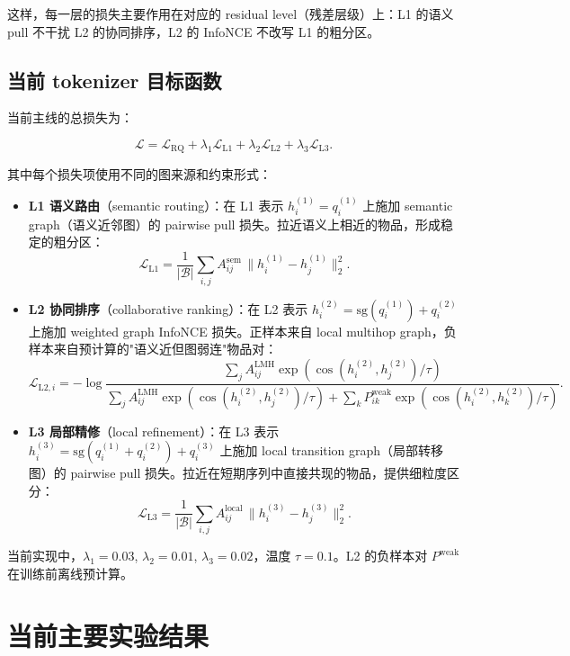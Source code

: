\documentclass[11pt]{article}
\newcommand{\sg}{\mathrm{sg}}
\begin{document}
这样，每一层的损失主要作用在对应的 residual level（残差层级）上：L1 的语义 pull 不干扰 L2 的协同排序，L2 的 InfoNCE 不改写 L1 的粗分区。

\subsection{当前 tokenizer 目标函数}

当前主线的总损失为：

\[
\mathcal{L}
=
\mathcal{L}_{\mathrm{RQ}}
+\lambda_1\mathcal{L}_{\mathrm{L1}}
+\lambda_2\mathcal{L}_{\mathrm{L2}}
+\lambda_3\mathcal{L}_{\mathrm{L3}}.
\]

其中每个损失项使用不同的图来源和约束形式：

\begin{itemize}
  \item \textbf{L1 语义路由}（semantic routing）：在 L1 表示 $h_i^{(1)}=q_i^{(1)}$ 上施加 semantic graph（语义近邻图）的 pairwise pull 损失。拉近语义上相近的物品，形成稳定的粗分区：
  \[
  \mathcal{L}_{\mathrm{L1}}
  =\frac{1}{|\mathcal{B}|}\sum_{i,j} A^{\mathrm{sem}}_{ij}\,
  \lVert h_i^{(1)}-h_j^{(1)}\rVert_2^2.
  \]

  \item \textbf{L2 协同排序}（collaborative ranking）：在 L2 表示 $h_i^{(2)}=\sg(q_i^{(1)})+q_i^{(2)}$ 上施加 weighted graph InfoNCE 损失。正样本来自 local multihop graph，负样本来自预计算的"语义近但图弱连"物品对：
  \[
  \mathcal{L}_{\mathrm{L2},i}
  =-\log
  \frac{
  \sum_{j} A^{\mathrm{LMH}}_{ij}\exp(\cos(h_i^{(2)},h_j^{(2)})/\tau)
  }{
  \sum_{j} A^{\mathrm{LMH}}_{ij}\exp(\cos(h_i^{(2)},h_j^{(2)})/\tau)
  +\sum_{k} P^{\mathrm{weak}}_{ik}\exp(\cos(h_i^{(2)},h_k^{(2)})/\tau)
  }.
  \]

  \item \textbf{L3 局部精修}（local refinement）：在 L3 表示 $h_i^{(3)}=\sg(q_i^{(1)}+q_i^{(2)})+q_i^{(3)}$ 上施加 local transition graph（局部转移图）的 pairwise pull 损失。拉近在短期序列中直接共现的物品，提供细粒度区分：
  \[
  \mathcal{L}_{\mathrm{L3}}
  =\frac{1}{|\mathcal{B}|}\sum_{i,j} A^{\mathrm{local}}_{ij}\,
  \lVert h_i^{(3)}-h_j^{(3)}\rVert_2^2.
  \]
\end{itemize}

当前实现中，$\lambda_1=0.03$, $\lambda_2=0.01$, $\lambda_3=0.02$，温度 $\tau=0.1$。L2 的负样本对 $P^{\mathrm{weak}}$ 在训练前离线预计算。

\section{当前主要实验结果}
\end{document}
